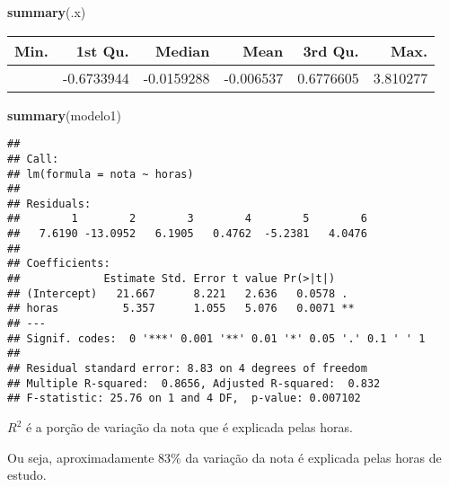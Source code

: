 \documentclass[
]{book}
\newenvironment{Shaded}{\begin{snugshade}}{\end{snugshade}}
\newcommand{\FunctionTok}[1]{\textcolor[rgb]{0.13,0.29,0.53}{\textbf{#1}}}
\newcommand{\NormalTok}[1]{#1}
\begin{document}
\begin{Shaded}
\begin{Highlighting}[]
\FunctionTok{summary}\NormalTok{(.x)}
\end{Highlighting}
\end{Shaded}

\begin{longtable}[]{@{}rrrrrr@{}}
\toprule\noalign{}
Min. & 1st Qu. & Median & Mean & 3rd Qu. & Max. \\
\midrule\noalign{}
\endhead
\bottomrule\noalign{}
\endlastfoot
-3.6713 & -0.6733944 & -0.0159288 & -0.006537 & 0.6776605 & 3.810277 \\
\end{longtable}

\begin{Shaded}
\begin{Highlighting}[]
\FunctionTok{summary}\NormalTok{(modelo1)}
\end{Highlighting}
\end{Shaded}

\begin{verbatim}
## 
## Call:
## lm(formula = nota ~ horas)
## 
## Residuals:
##        1        2        3        4        5        6 
##   7.6190 -13.0952   6.1905   0.4762  -5.2381   4.0476 
## 
## Coefficients:
##             Estimate Std. Error t value Pr(>|t|)   
## (Intercept)   21.667      8.221   2.636   0.0578 . 
## horas          5.357      1.055   5.076   0.0071 **
## ---
## Signif. codes:  0 '***' 0.001 '**' 0.01 '*' 0.05 '.' 0.1 ' ' 1
## 
## Residual standard error: 8.83 on 4 degrees of freedom
## Multiple R-squared:  0.8656, Adjusted R-squared:  0.832 
## F-statistic: 25.76 on 1 and 4 DF,  p-value: 0.007102
\end{verbatim}

\(R^2\) é a porção de variação da nota que é explicada pelas horas.

Ou seja, aproximadamente 83\% da variação da nota é explicada pelas
horas de estudo.
\end{document}
